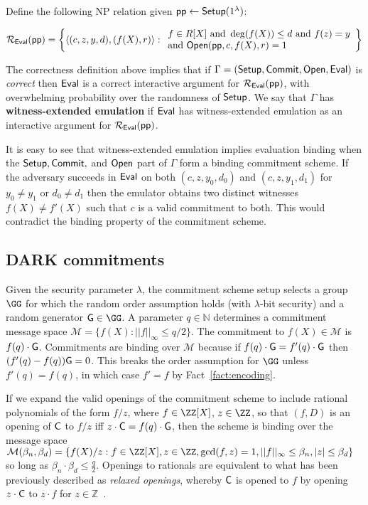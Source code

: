 Define the following NP relation given $\textsf{pp} \leftarrow \textsf{{Setup}}(1^\lambda)$: 
\begin{small}
\[ 
\mathcal{R_\textsf{Eval}}(\textsf{pp}) = \left\{
\langle (c, z, y, d), (f(X), r) \rangle
: 
\begin{array}{l} 
f \in R[X] \ \text{and} \ \deg(f(X)) \leq d \ \text{and} \ f(z) = y \\ 
 \text{and} \ \textsf{{Open}}(\textsf{pp}, c, f(X), r) = 1 \\
\end{array}
\right\}
\] 
\end{small}
The correctness definition above implies that if $\Gamma = (\textsf{{Setup}}, \textsf{{Commit}}, \textsf{{Open}}, \textsf{{Eval}})$ is \emph{correct} then $\textsf{{Eval}}$ is a correct interactive argument for $\mathcal{R_\textsf{Eval}}(\textsf{pp})$, with overwhelming probability over the randomness of $\textsf{{Setup}}$. We say that $\Gamma$ has \textbf{witness-extended emulation} if $\textsf{{Eval}}$ has witness-extended emulation as an interactive argument for $\mathcal{R_\textsf{Eval}}(\textsf{pp})$. 

It is easy to see that witness-extended emulation implies evaluation binding when the $\textsf{{Setup}}, \textsf{{Commit}},$ and $\textsf{{Open}}$ part of $\Gamma$ form a binding commitment scheme. If the adversary succeeds in $\textsf{{Eval}}$ on both $(c, z, y_0, d_0)$ and $(c, z, y_1, d_1)$ for $y_0 \neq y_1$ or $d_0 \neq d_1$ then the emulator obtains two distinct witnesses $f(X) \neq f'(X)$ such that $c$ is a valid commitment to both. This would contradict the binding property of the commitment scheme. 


\subsection{DARK commitments} 
Given the security parameter $\lambda$, the commitment scheme setup selects a group $\GG$ for which the random order assumption holds (with  $\lambda$-bit security) and a random generator $\gr{G} \in \GG$. A parameter $q \in \mathbb{N}$ determines a commitment message space $\mathcal{M} = \{f(X): ||f||_\infty \leq q/2\}$. The commitment to $f(X) \in \mathcal{M}$ is $f(q) \cdot  \gr{G}$. Commitments are binding over $\mathcal{M}$ because if $f(q) \cdot \gr{G} = f'(q) \cdot \gr{G}$ then $(f'(q) - f(q)) \gr{G} = 0$. This breaks the order assumption for $\GG$ unless $ f'(q) =  f(q)$, in which case $f' = f$ by Fact~\ref{fact:encoding}. 

If we expand the valid openings of the commitment scheme to include rational polynomials of the form $f/z$, where $f \in \ZZ[X]$, $z \in \ZZ$, so that $(f,D)$ is an opening of $\gr{C}$ to $f/z$ iff $z \cdot \gr{C} = f(q) \cdot \gr{G}$, then the scheme is binding over the message space $\mathcal{M}(\beta_n, \beta_d) =  \{f(X)/z: f \in \ZZ[X], z \in \ZZ, \gcd(f,z) = 1, ||f||_\infty \leq \beta_n, |z| \leq \beta_d \}$ so long as $\beta_n \cdot \beta_d \leq \frac{q}{2}$. 
Openings to rationals are equivalent to what has been previously described as \emph{relaxed openings}, whereby $\gr{C}$ is opened to $f$ by opening $z \cdot \gr{C}$ to $z \cdot f$ for $z \in \mathbb{Z}$~\cite{?,?}. 

